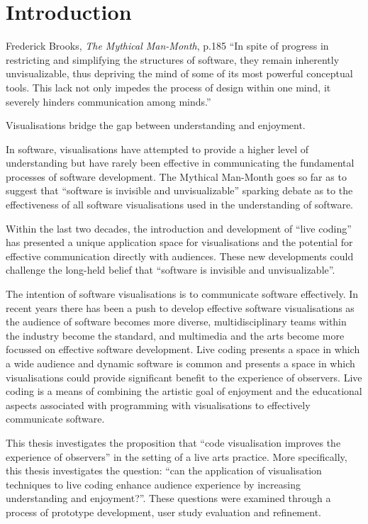 
\chapter{Introduction}
\label{chap:introduction}

\begin{chapquote}{Frederick Brooks, \textit{The Mythical Man-Month}, p.185}
``In spite of progress in restricting and simplifying the structures of software, they remain inherently unvisualizable, thus depriving the mind of some of its most powerful conceptual tools. This lack not only impedes the process of design within one mind, it severely hinders communication among minds.''
\end{chapquote}

Visualisations bridge the gap between understanding and enjoyment. \more

In software, visualisations have attempted to provide a higher level of understanding but have rarely been effective in communicating the fundamental processes of software development. The Mythical Man-Month goes so far as to suggest that ``software is invisible and unvisualizable''\cite{Brooks1995} sparking debate as to the effectiveness of all software visualisations used in the understanding of software.

Within the last two decades, the introduction and development of ``live coding'' has presented a unique application space for visualisations and the potential for effective communication directly with audiences. These new developments could challenge the long-held belief that ``software is invisible and unvisualizable''.

The intention of software visualisations is to communicate software effectively. In recent years there has been a push to develop effective software visualisations as the audience of software becomes more diverse, multidisciplinary teams within the industry become the standard, and multimedia and the arts become more focussed on effective software development. Live coding presents a space in which a wide audience and dynamic software is common and presents a space in which visualisations could provide significant benefit to the experience of observers. Live coding is a means of combining the artistic goal of enjoyment and the educational aspects associated with programming with visualisations to effectively communicate software.

This thesis investigates the proposition that ``code visualisation improves the experience of observers'' in the setting of a live arts practice. More specifically, this thesis investigates the question: ``can the application of visualisation techniques to live coding enhance audience experience by increasing understanding and enjoyment?''. These questions were examined through a process of prototype development, user study evaluation and refinement.

